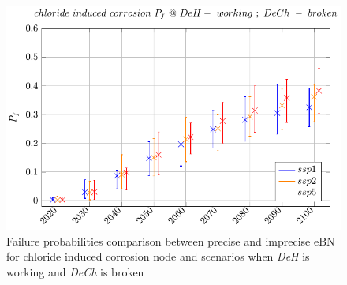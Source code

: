 \begin{figure}[H]
    \centering
    \includegraphics[width=0.8\linewidth]{imgs/pdfs/21_Chloride_comparizon_workingbroken.pdf}
    \caption{Failure probabilities comparison between precise and imprecise eBN for chloride induced corrosion node and scenarios when \textit{DeH} is working and \textit{DeCh} is broken}\label{comparizon_ch_brokenworking}
\end{figure}
